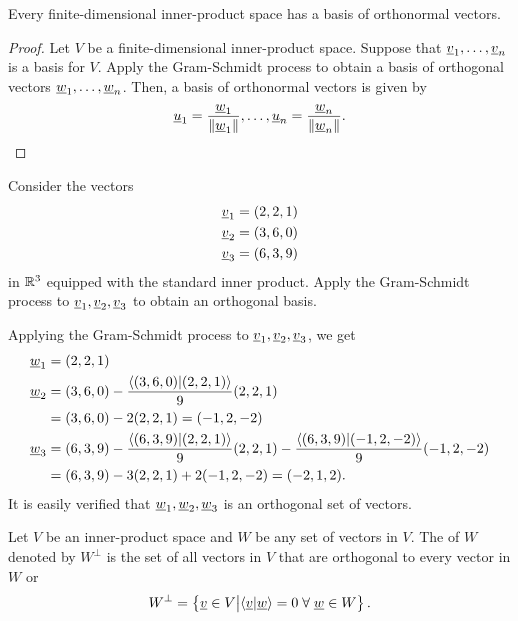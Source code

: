 \begin{corollary}
\label{cor:orthonormal_basis}
Every finite-dimensional inner-product space has a basis of orthonormal vectors.
\end{corollary}
\begin{proof}
Let $V$ be a finite-dimensional inner-product space.
Suppose that $\underline{v}_1, \ldots, \underline{v}_n$ is a basis for $V$.
Apply the Gram-Schmidt process to obtain a basis of orthogonal vectors $\underline{w}_1, \ldots, \underline{w}_n$.
Then, a basis of orthonormal vectors is given by
\begin{equation*}
\underline{u}_1 = \frac{ \underline{w}_1 }{ \left\| \underline{w}_1 \right\| }, \ldots,
\underline{u}_n = \frac{ \underline{w}_n }{ \left\| \underline{w}_n \right\| }.
\end{equation*}
\end{proof}

\begin{example}
Consider the vectors
\begin{align*}
\underline{v}_1 &= (2,2,1) \\
\underline{v}_2 &= (3,6,0) \\
\underline{v}_3 &= (6,3,9)
\end{align*}
in $\mathbb{R}^3$ equipped with the standard inner product.
Apply the Gram-Schmidt process to $\underline{v}_1, \underline{v}_2, \underline{v}_3$ to obtain an orthogonal basis.

Applying the Gram-Schmidt process to $\underline{v}_1, \underline{v}_2, \underline{v}_3$, we get
\begin{align*}
\underline{w}_1 &= (2,2,1) \\
\underline{w}_2 &= (3,6,0)
- \frac{ \left\langle (3,6,0) | (2,2,1) \right\rangle }{ 9 } (2,2,1) \\
&= (3,6,0) - 2 (2,2,1) = (-1,2,-2) \\
\underline{w}_3 &= (6,3,9)
- \frac{ \left\langle (6,3,9) | (2,2,1) \right\rangle }{ 9 } (2,2,1)
- \frac{ \left\langle (6,3,9) | (-1,2,-2) \right\rangle }{ 9 } (-1,2,-2) \\
&= (6,3,9) - 3 (2,2,1) + 2 (-1,2,-2) = (-2,1,2) .
\end{align*}
It is easily verified that $\underline{w}_1, \underline{w}_2, \underline{w}_3$ is an orthogonal set of vectors.
\end{example}

\begin{definition}
Let $V$ be an inner-product space and $W$ be any set of vectors in $V$.
The  of $W$ denoted by $W^{\bot}$ is the set of all vectors in $V$ that are orthogonal to every vector in $W$ or
\begin{equation*}
W^{\bot} = \left\{ \underline{v} \in V \big| \langle \underline{v} | \underline{w} \rangle = 0 \; \forall \; \underline{w}\in W \right\}. 
\end{equation*}
\end{definition}

